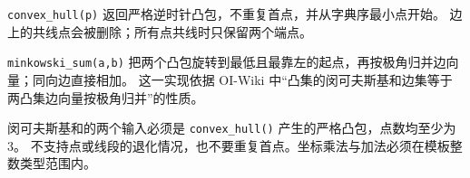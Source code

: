 \texttt{convex\_hull(p)} 返回严格逆时针凸包，不重复首点，并从字典序最小点开始。
边上的共线点会被删除；所有点共线时只保留两个端点。

\texttt{minkowski\_sum(a,b)} 把两个凸包旋转到最低且最靠左的起点，再按极角归并边向量；同向边直接相加。
这一实现依据 OI-Wiki 中“凸集的闵可夫斯基和边集等于两凸集边向量按极角归并”的性质。

\begin{icpcwarning}[输入约定]
  闵可夫斯基和的两个输入必须是 \texttt{convex\_hull()} 产生的严格凸包，点数均至少为 $3$。
  不支持点或线段的退化情况，也不要重复首点。坐标乘法与加法必须在模板整数类型范围内。
\end{icpcwarning}

